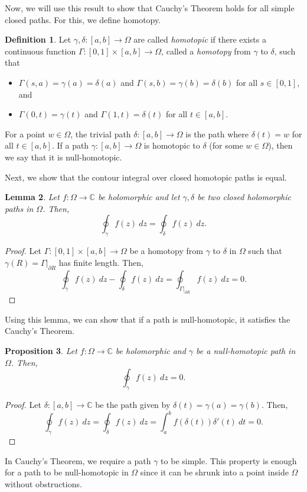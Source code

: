 \documentclass[a4paper, openany]{memoir}
\theoremstyle{definition}
\newtheorem{definition}{Definition}[section]
\theoremstyle{plain}
\newtheorem{lemma}[definition]{Lemma}
\newtheorem{proposition}[definition]{Proposition}
\begin{document}
Now, we will use this result to show that Cauchy's Theorem holds for all simple closed paths. For this, we define homotopy.
\begin{definition}
Let $\gamma, \delta: [a, b] \to \Omega$ are called \emph{homotopic} if there exists a continuous function $\Gamma: [0, 1] \times [a, b] \to \Omega$, called a \emph{homotopy} from $\gamma$ to $\delta$, such that
\begin{itemize}
    \item $\Gamma(s, a) = \gamma(a) = \delta(a)$ and $\Gamma(s, b) = \gamma(b) = \delta(b)$ for all $s \in [0, 1]$, and
    \item $\Gamma(0, t) = \gamma(t)$ and $\Gamma(1, t) = \delta(t)$ for all $t \in [a, b]$.
\end{itemize}
\end{definition}
For a point $w \in \Omega$, the trivial path $\delta: [a, b] \to \Omega$ is the path where $\delta(t) = w$ for all $t \in [a, b]$. If a path $\gamma: [a, b] \to \Omega$ is homotopic to $\delta$ (for some $w \in \Omega$), then we say that it is null-homotopic.

Next, we show that the contour integral over closed homotopic paths is equal.
\begin{lemma}
Let $f: \Omega \to \mathbb{C}$ be holomorphic and let $\gamma, \delta$ be two closed holomorphic paths in $\Omega$. Then,
\[\oint_\gamma f(z) \ dz = \oint_\delta f(z) \ dz.\]
\end{lemma}
\begin{proof}
Let $\Gamma: [0, 1] \times [a, b] \to \Omega$ be a homotopy from $\gamma$ to $\delta$ in $\Omega$ such that $\gamma(R) = \Gamma|_{\partial R}$ has finite length. Then,
\[\oint_\gamma f(z) \ dz - \oint_\delta f(z) \ dz =  \oint_{\Gamma|_{\partial R}} f(z) \ dz = 0.\]
\end{proof}
Using this lemma, we can show that if a path is null-homotopic, it satisfies the Cauchy's Theorem.
\begin{proposition}
Let $f: \Omega \to \mathbb{C}$ be holomorphic and $\gamma$ be a null-homotopic path in $\Omega$. Then,
\[\oint_\gamma f(z) \ dz = 0.\]
\end{proposition}
\begin{proof}
Let $\delta: [a, b] \to \mathbb{C}$ be the path given by $\delta(t) = \gamma(a) = \gamma(b)$. Then,
\[\oint_\gamma f(z) \ dz = \oint_\delta f(z) \ dz = \int_a^b f(\delta(t)) \delta'(t) \ dt = 0.\]
\end{proof}
\noindent In Cauchy's Theorem, we require a path $\gamma$ to be simple. This property is enough for a path to be null-homotopic in $\Omega$ since it can be shrunk into a point inside $\Omega$ without obstructions.
\end{document}
